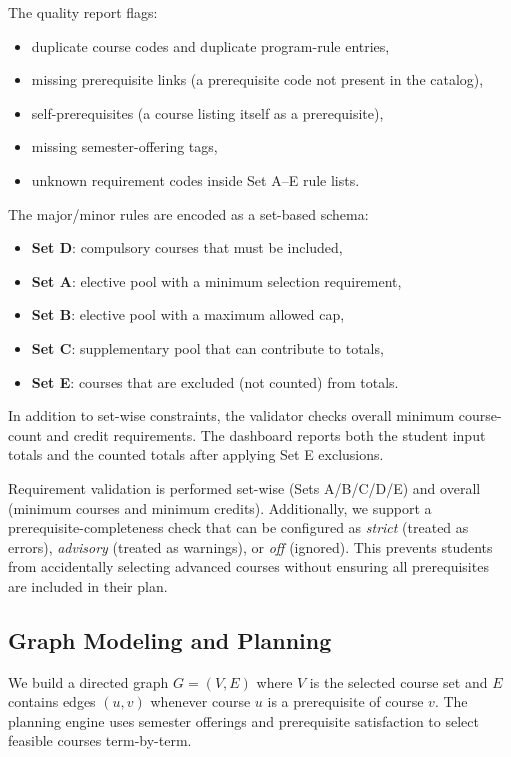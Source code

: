 The quality report flags:
\begin{itemize}
    \item duplicate course codes and duplicate program-rule entries,
    \item missing prerequisite links (a prerequisite code not present in the catalog),
    \item self-prerequisites (a course listing itself as a prerequisite),
    \item missing semester-offering tags,
    \item unknown requirement codes inside Set A--E rule lists.
\end{itemize}

The major/minor rules are encoded as a set-based schema:
\begin{itemize}
    \item \textbf{Set D}: compulsory courses that must be included,
    \item \textbf{Set A}: elective pool with a minimum selection requirement,
    \item \textbf{Set B}: elective pool with a maximum allowed cap,
    \item \textbf{Set C}: supplementary pool that can contribute to totals,
    \item \textbf{Set E}: courses that are excluded (not counted) from totals.
\end{itemize}

In addition to set-wise constraints, the validator checks overall minimum
course-count and credit requirements. The dashboard reports both the student
input totals and the counted totals after applying Set E exclusions.

Requirement validation is performed set-wise (Sets A/B/C/D/E) and overall
(minimum courses and minimum credits). Additionally, we support a
prerequisite-completeness check that can be configured as \textit{strict}
(treated as errors), \textit{advisory} (treated as warnings), or \textit{off}
(ignored). This prevents students from accidentally selecting advanced courses
without ensuring all prerequisites are included in their plan.

\subsection{Graph Modeling and Planning}
We build a directed graph $G=(V,E)$ where $V$ is the selected course set and
$E$ contains edges $(u,v)$ whenever course $u$ is a prerequisite of course $v$.
The planning engine uses semester offerings and prerequisite satisfaction to
select feasible courses term-by-term.

